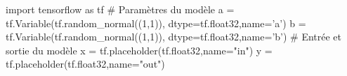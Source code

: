 import tensorflow as tf
# Paramètres du modèle
a = tf.Variable(tf.random_normal((1,1)), dtype=tf.float32,name='a')
b = tf.Variable(tf.random_normal((1,1)), dtype=tf.float32,name='b')
# Entrée et sortie du modèle
x = tf.placeholder(tf.float32,name="in")
y = tf.placeholder(tf.float32,name="out")

